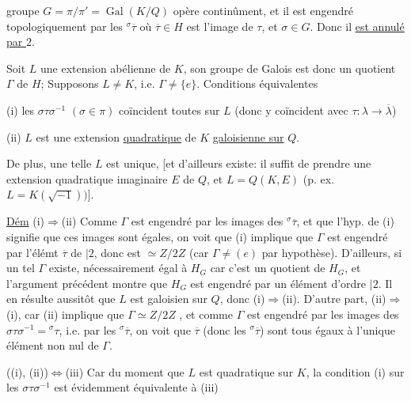  groupe $G=\pi/\pi'=\operatorname{Gal}(K/Q)$ opère continûment, et il est engendré topologiquement par les ${}^{\sigma}\overline\tau$ où $\overline\tau\in H$ est l'image de $\tau$, et $\sigma\in G$. Donc il \uline{est annulé par $2$}.

Soit $L$ une extension abélienne de $K$,  son groupe de Galois est donc un quotient $\Gamma$ de $H$;  Supposons $L\ne K$, i.e. $\Gamma\ne\{e\}$. Conditions équivalentes

(i) les $\sigma\tau\sigma^{-1}$ $(\sigma\in\pi)$ coïncident toutes sur $L$ (donc y coïncident avec $\tau:\lambda\to\overline\lambda$)

(ii) $L$ est une extension \uline{quadratique} de $K$ \uline{galoisienne sur} $Q$.


De plus, une telle $L$  est unique, [et d'ailleurs existe: il suffit de prendre une extension quadratique imaginaire $E$ de $Q$,  et $L=Q(K,E)$ (p. ex. $L=K(\sqrt{-1}))$].

\uline{Dém} (i)$\Rightarrow$(ii) Comme $\Gamma$ est engendré par les images  des ${}^{\sigma}\overline\tau$,  et que l'hyp. de (i) signifie que ces images sont égales, on voit que (i) implique que $\Gamma$ est engendré par l'élémt $\overline\tau$ de  $|2$, donc est $\simeq Z/2Z$ (car $\Gamma\ne(e)$ par hypothèse). D'ailleurs, si un tel $\Gamma$ existe,   nécessairement égal à $H_G$ car  c'est un quotient de $H_G$, et l'argument précédent montre que  $H_G$ est engendré par un élément d'ordre $|2$.   Il en résulte aussitôt que $L$ est galoisien sur $Q$, donc (i)$\Rightarrow$(ii). D'autre part, (ii)$\Rightarrow$(i), car (ii) implique que $\Gamma\simeq Z/2Z$ , et comme $\Gamma$ est engendré par les images des $\sigma\tau\sigma^{-1}={}^{\sigma}\tau$, i.e. par les ${}^{\sigma}\overline\tau$, on voit que $\overline\tau$ (donc les ${}^{\sigma}\overline\tau$) sont tous égaux à l'unique élément non nul de $\Gamma$.

((i), (ii))$\Longleftrightarrow$(iii) Car du moment que $L$ est quadratique sur $K$, la condition (i) sur les $\sigma\tau\sigma^{-1}$ est évidemment équivalente à (iii)
